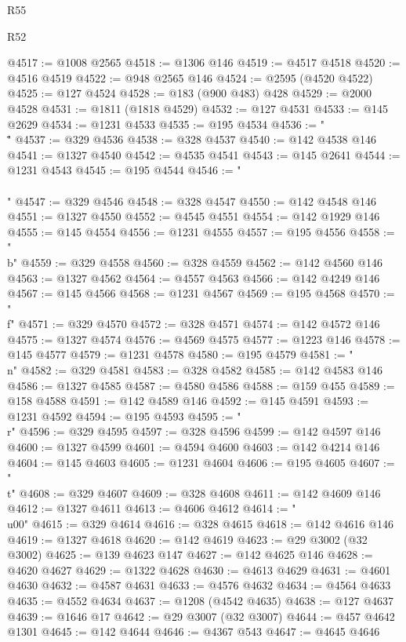 \begin{lexlean}{R55}
\begin{lexlean}{R52}
\begin{coremodule}
{{{{{{{{{{{{{{{{{{{{{{{{{{{{{{{{{{{{{{{{{{{{{{{{{{{{{{{{{{{{{{{{{{{{{{{{{{{{{{{{{{{{{{{{{{{{{{{{{{{{{{{{{{{{{{{{{{{{{{{{{{{{{{{{{{{{{{{{{{{{{{{{{{{{{{{{{{{{{{{{{{{{{{{{{{{{{{{{{{{{{{{{{{{{{{{{{{{{{{@4517 := @1008 @2565
@4518 := @1306 @146
@4519 := @4517 @4518
@4520 := @4516 @4519
@4522 := @948 @2565 @146
@4524 := @2595 (@4520 @4522)
@4525 := @127 @4524
@4528 := @183 (@900 @483) @428
@4529 := @2000 @4528
@4531 := @1811 (@1818 @4529)
@4532 := @127 @4531
@4533 := @145 @2629
@4534 := @1231 @4533
@4535 := @195 @4534
@4536 := "\\\""
@4537 := @329 @4536
@4538 := @328 @4537
@4540 := @142 @4538 @146
@4541 := @1327 @4540
@4542 := @4535 @4541
@4543 := @145 @2641
@4544 := @1231 @4543
@4545 := @195 @4544
@4546 := "\\\\"
@4547 := @329 @4546
@4548 := @328 @4547
@4550 := @142 @4548 @146
@4551 := @1327 @4550
@4552 := @4545 @4551
@4554 := @142 @1929 @146
@4555 := @145 @4554
@4556 := @1231 @4555
@4557 := @195 @4556
@4558 := "\\b"
@4559 := @329 @4558
@4560 := @328 @4559
@4562 := @142 @4560 @146
@4563 := @1327 @4562
@4564 := @4557 @4563
@4566 := @142 @4249 @146
@4567 := @145 @4566
@4568 := @1231 @4567
@4569 := @195 @4568
@4570 := "\\f"
@4571 := @329 @4570
@4572 := @328 @4571
@4574 := @142 @4572 @146
@4575 := @1327 @4574
@4576 := @4569 @4575
@4577 := @1223 @146
@4578 := @145 @4577
@4579 := @1231 @4578
@4580 := @195 @4579
@4581 := "\\n"
@4582 := @329 @4581
@4583 := @328 @4582
@4585 := @142 @4583 @146
@4586 := @1327 @4585
@4587 := @4580 @4586
@4588 := @159 @455
@4589 := @158 @4588
@4591 := @142 @4589 @146
@4592 := @145 @4591
@4593 := @1231 @4592
@4594 := @195 @4593
@4595 := "\\r"
@4596 := @329 @4595
@4597 := @328 @4596
@4599 := @142 @4597 @146
@4600 := @1327 @4599
@4601 := @4594 @4600
@4603 := @142 @4214 @146
@4604 := @145 @4603
@4605 := @1231 @4604
@4606 := @195 @4605
@4607 := "\\t"
@4608 := @329 @4607
@4609 := @328 @4608
@4611 := @142 @4609 @146
@4612 := @1327 @4611
@4613 := @4606 @4612
@4614 := "\\u00"
@4615 := @329 @4614
@4616 := @328 @4615
@4618 := @142 @4616 @146
@4619 := @1327 @4618
@4620 := @142 @4619
@4623 := @29 @3002 (@32 @3002)
@4625 := @139 @4623 @147
@4627 := @142 @4625 @146
@4628 := @4620 @4627
@4629 := @1322 @4628
@4630 := @4613 @4629
@4631 := @4601 @4630
@4632 := @4587 @4631
@4633 := @4576 @4632
@4634 := @4564 @4633
@4635 := @4552 @4634
@4637 := @1208 (@4542 @4635)
@4638 := @127 @4637
@4639 := @1646 @17
@4642 := @29 @3007 (@32 @3007)
@4644 := @457 @4642 @1301
@4645 := @142 @4644
@4646 := @4367 @543
@4647 := @4645 @4646
}}}}}}}}}}}}}}}}}}}}}}}}}}}}}}}}}}}}}}}}}}}}}}}}}}}}}}}}}}}}}}}}}}}}}}}}}}}}}}}}}}}}}}}}}}}}}}}}}}}}}}}}}}}}}}}}}}}}}}}}}}}}}}}}}}}}}}}}}}}}}}}}}}}}}}}}}}}}}}}}}}}}}}}}}}}}}}}}}}}}}}}}}}}}}}}}}}}}}}
\end{coremodule}
\end{lexlean}
\end{lexlean}

